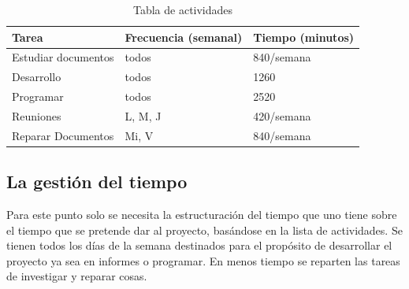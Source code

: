 \documentclass[a4paper,12pt,openany,oneside]{book}
\begin{document}
\newpage
\begin{table}[!ht]
\begin{tabular}{|l | l | l |}
\hline
\textbf{Tarea} & \textbf{Frecuencia (semanal)} & \textbf{Tiempo (minutos)} \\
\hline
Estudiar documentos & todos & 840/semana\\
\hline
Desarrollo & todos & 1260\\
\hline
Programar & todos & 2520\\
\hline
Reuniones & L, M, J & 420/semana\\
\hline
Reparar Documentos & Mi, V & 840/semana\\
\hline
\end{tabular}
\caption{Tabla de actividades}
\end{table}
\subsection{La gestión del tiempo}
Para este punto solo se necesita la estructuración del tiempo que uno tiene sobre el tiempo que se pretende dar al proyecto, basándose en la lista de actividades. Se tienen todos los días de la semana destinados para el propósito de desarrollar el proyecto ya sea en informes o programar. En menos tiempo se reparten las tareas de investigar y reparar cosas.
\end{document}
